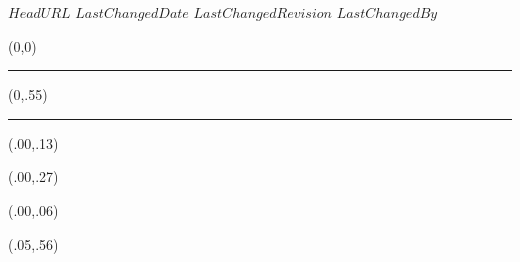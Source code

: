\svnidlong
{$HeadURL$}
{$LastChangedDate$}
{$LastChangedRevision$}
{$LastChangedBy$}

\thispagestyle{empty}
\addtocounter{page}{-1}

\begin{textblock}{1}(0,0)
	\noindent\textcolor{redill}{\rule{\paperwidth}{.55\paperheight}}
\end{textblock}


\begin{textblock}{1}(0,.55)
	\noindent\textcolor{black}{\rule{\paperwidth}{.45\paperheight}}
\end{textblock}


\begin{textblock}{1}(.00,.13)
	\begin{center}
	\end{center}
\end{textblock}

\begin{textblock}{1}(.00,.27)
	\begin{center}
	\end{center}
\end{textblock}


\begin{textblock}{1}(.00,.06)
	\begin{center}
			\noindent {\fontsize{20.74}{2}\selectfont
			\bfseries\textcolor{white}{Elisa Antuca\ \ \ Massimo Bertolotti}}
	\end{center}
\end{textblock}



\begin{textblock}{.9}(.05,.56)
	\begin{flushright}
		\noindent {\fontsize{20.74}{2}\selectfont
			\bfseries\textcolor{white}{Manualozzo di Geometria 2}}
	\end{flushright}
\end{textblock}



